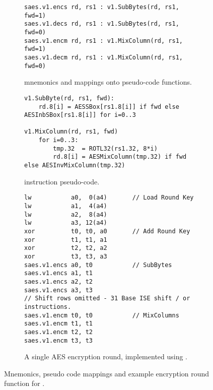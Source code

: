 
%


\begin{figure}[h]
\begin{subfigure}{\textwidth}
\begin{lstlisting}[language=pseudo,style=block]
saes.v1.encs rd, rs1 : v1.SubBytes(rd, rs1, fwd=1)
saes.v1.decs rd, rs1 : v1.SubBytes(rd, rs1, fwd=0)
saes.v1.encm rd, rs1 : v1.MixColumn(rd, rs1, fwd=1)
saes.v1.decm rd, rs1 : v1.MixColumn(rd, rs1, fwd=0)
\end{lstlisting}
\caption{
 mnemonics and mappings onto pseudo-code functions.
}
\label{fig:mnemonics:v1}
\end{subfigure}
\begin{subfigure}{\textwidth}
\begin{lstlisting}[language=pseudo,style=block]
v1.SubByte(rd, rs1, fwd):
    rd.8[i] = AESSBox[rs1.8[i]] if fwd else AESInbSBox[rs1.8[i]] for i=0..3

v1.MixColumn(rd, rs1, fwd)
    for i=0..3:
        tmp.32  = ROTL32(rs1.32, 8*i)
        rd.8[i] = AESMixColumn(tmp.32) if fwd else AESInvMixColumn(tmp.32)
\end{lstlisting}
\caption{
     instruction pseudo-code.
}
\label{fig:pseudo:v1}
\end{subfigure}
\begin{subfigure}{\textwidth}
\begin{lstlisting}[language=pseudo,style=block]
lw           a0,  0(a4)       // Load Round Key
lw           a1,  4(a4)
lw           a2,  8(a4)
lw           a3, 12(a4)
xor          t0, t0, a0       // Add Round Key
xor          t1, t1, a1
xor          t2, t2, a2
xor          t3, t3, a3
saes.v1.encs a0, t0           // SubBytes
saes.v1.encs a1, t1
saes.v1.encs a2, t2
saes.v1.encs a3, t3
// Shift rows omitted - 31 Base ISE shift / or instructions.
saes.v1.encm t0, t0           // MixColumns
saes.v1.encm t1, t1
saes.v1.encm t2, t2
saes.v1.encm t3, t3
\end{lstlisting}
\caption{
A single AES encryption round, implemented using .
}
\label{fig:round:v1}
\end{subfigure}
\caption{
    Mnemonics, pseudo code mappings and example encryption
    round function for .
}
\end{figure}

